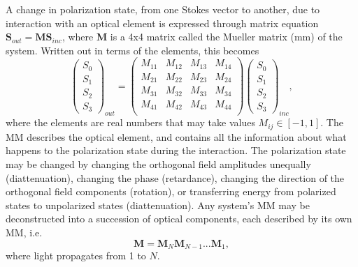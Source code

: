 A change in polarization state, from one Stokes vector to another, due to interaction with an optical element is expressed through matrix equation $\mathbf{S}_{out} = \mathbf{M}\mathbf{S}_{inc}$, where $\mathbf{M}$ is a 4x4 matrix called the Mueller matrix (\ac{mm}) of the system. Written out in terms of the elements, this becomes
\begin{equation}
    \begin{pmatrix}
        S_0 \\
        S_1 \\
        S_2 \\
        S_3
    \end{pmatrix}_{out}
    =
    \begin{pmatrix}
    M_{11} & M_{12} & M_{13} & M_{14}   \\
    M_{21} & M_{22} & M_{23} & M_{24}   \\
    M_{31} & M_{32} & M_{33} & M_{34}   \\
    M_{41} & M_{42} & M_{43} & M_{44}   \\
    \end{pmatrix}
    \begin{pmatrix}
        S_0 \\
        S_1 \\
        S_2 \\
        S_3
    \end{pmatrix}_{inc},
\end{equation}
where the elements are real numbers that may take values $M_{ij}\in[-1,1]$. The MM describes the optical element, and contains all the information about what happens to the polarization state during the interaction. The polarization state may be changed by changing the orthogonal field amplitudes unequally (diattenuation), changing the phase (retardance), changing the direction of the orthogonal field components (rotation), or transferring energy from polarized states to unpolarized states (diattenuation). Any system's MM may be deconstructed into a succession of optical components, each described by its own MM, i.e.\cite{hans_arwin}
\begin{equation}
    \mathbf{M} = \mathbf{M}_N \mathbf{M}_{N-1}...\mathbf{M}_1, 
\end{equation}
where light propagates from 1 to $N$.

